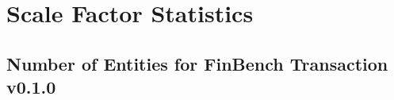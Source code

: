 \chapter{Scale Factor Statistics}
\label{sec:sf-statistics}

\section{Number of Entities for FinBench Transaction v0.1.0}


